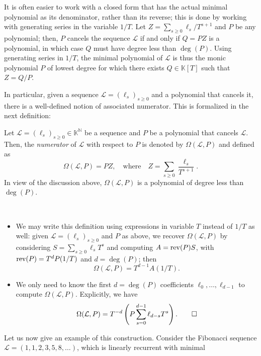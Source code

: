 \documentclass[12pt]{article}
\newcommand{\genseries}{Z}
\newcommand{\minpoly}{P}
\def\N {\ensuremath{\mathbb{N}}}
\def\K{\mathbb{K}}
\def\K {\ensuremath{\mathbb{K}}}
\begin{document}
It is often easier to work with a closed form that has the actual
minimal polynomial as its denominator, rather than its reverse; this
is done by working with generating series in the variable $1/T$.  Let
$\genseries = \sum_{s\ge0} \ell_s / T^{s+1}$ and $\minpoly$
be any polynomial; then, $\minpoly$ cancels the sequence $\mathcal{L}$
if and only if $Q=\minpoly \genseries $ is a polynomial, in which case $Q$
must have degree less than $\deg(\minpoly)$.  Using generating series in
$1/T$, the minimal polynomial of $\mathcal{L}$ is thus the
monic polynomial $\minpoly$ of lowest degree for which there exists $Q \in
\K[T]$ such that $\genseries=Q/\minpoly$.

In particular, given a sequence $\mathcal{L}=(\ell_s)_{s \ge 0}$ and a
polynomial that cancels it, there is a well-defined notion of
associated numerator.  This is formalized in the next definition:
\begin{definition}
  \label{def:omega}
  Let $\mathcal{L}=(\ell_s)_{s \ge 0}\in \K^\N$ be a sequence and $P$ be a
  polynomial that cancels $\mathcal{L}$. Then, the {\em numerator} of $\mathcal{L}$
  with respect to $P$ is denoted by $\Omega(\mathcal{L},P)$ and defined as 
  \[
    \Omega(\mathcal{L},P) = P \genseries, \quad\text{where}\quad
    \genseries=\sum_{s \ge 0} \frac {\ell_s}{T^{s+1}}.
  \]
  In view of the discussion above, $\Omega(\mathcal{L},P)$ is a polynomial of
  degree less than $\deg(P)$.
\end{definition}
\begin{remark} ~
  \begin{itemize}
  \item We may write this definition using expressions in
    variable $T$ instead of $1/T$ as well: given
    $\mathcal{L}=(\ell_s)_{s\ge0}$ and $P$ as above, we recover
    $\Omega(\mathcal{L},P)$ by considering $S=\sum_{s\ge 0} \ell_s
    T^s$ and computing $A = {\rm rev}(P) S$, with ${\rm rev}(P)=T^d
    P(1/T)$ and $d=\deg(P)$; then
    $$\Omega(\mathcal{L} ,P) = T^{d - 1} A (1/T).$$ 
\item We only need to know the first $d=\deg(P)$ coefficients
  $\ell_0,\dots,\ell_{d-1}$ to compute $\Omega(\mathcal{L}, P)$. Explicitly, we
  have
  \[
    \Omega(\mathcal{L},P) = T^{-d} \left( P \sum_{s=0}^{d-1} \ell_{d - s} T^s \right).
    \qedhere
  \]
 \end{itemize}
\end{remark}
Let us now give an example of this construction. Consider the Fibonacci sequence
$\mathcal{L} = (1,1,2,3,5,8,\dots)$, which is linearly recurrent with minimal
\end{document}
